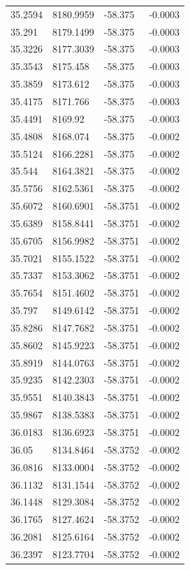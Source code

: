\begin{table}[H]
\begin{tabular}{llll}
35.2594 & 8180.9959 & -58.375 & -0.0003 \\
35.291 & 8179.1499 & -58.375 & -0.0003 \\
35.3226 & 8177.3039 & -58.375 & -0.0003 \\
35.3543 & 8175.458 & -58.375 & -0.0003 \\
35.3859 & 8173.612 & -58.375 & -0.0003 \\
35.4175 & 8171.766 & -58.375 & -0.0003 \\
35.4491 & 8169.92 & -58.375 & -0.0003 \\
35.4808 & 8168.074 & -58.375 & -0.0002 \\
35.5124 & 8166.2281 & -58.375 & -0.0002 \\
35.544 & 8164.3821 & -58.375 & -0.0002 \\
35.5756 & 8162.5361 & -58.375 & -0.0002 \\
35.6072 & 8160.6901 & -58.3751 & -0.0002 \\
35.6389 & 8158.8441 & -58.3751 & -0.0002 \\
35.6705 & 8156.9982 & -58.3751 & -0.0002 \\
35.7021 & 8155.1522 & -58.3751 & -0.0002 \\
35.7337 & 8153.3062 & -58.3751 & -0.0002 \\
35.7654 & 8151.4602 & -58.3751 & -0.0002 \\
35.797 & 8149.6142 & -58.3751 & -0.0002 \\
35.8286 & 8147.7682 & -58.3751 & -0.0002 \\
35.8602 & 8145.9223 & -58.3751 & -0.0002 \\
35.8919 & 8144.0763 & -58.3751 & -0.0002 \\
35.9235 & 8142.2303 & -58.3751 & -0.0002 \\
35.9551 & 8140.3843 & -58.3751 & -0.0002 \\
35.9867 & 8138.5383 & -58.3751 & -0.0002 \\
36.0183 & 8136.6923 & -58.3751 & -0.0002 \\
36.05 & 8134.8464 & -58.3752 & -0.0002 \\
36.0816 & 8133.0004 & -58.3752 & -0.0002 \\
36.1132 & 8131.1544 & -58.3752 & -0.0002 \\
36.1448 & 8129.3084 & -58.3752 & -0.0002 \\
36.1765 & 8127.4624 & -58.3752 & -0.0002 \\
36.2081 & 8125.6164 & -58.3752 & -0.0002 \\
36.2397 & 8123.7704 & -58.3752 & -0.0002 \\

\end{tabular}
\end{table}
